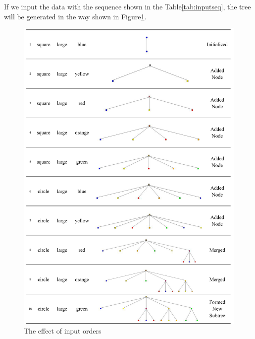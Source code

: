  If we input the data with the sequence shown in the Table\ref{tab:inputseq}, the tree will be generated in the way shown in Figure\ref{Fig:inputseq1}. 
 \begin{figure}[h!]
            \centering
            \includegraphics[width=420pt]{../images/inputseq1.jpg}
            \caption{The effect of input orders}
            \label{Fig:inputseq1}
 \end{figure}      

